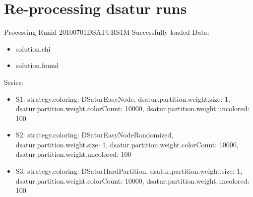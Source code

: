 \documentclass[landscape, 12pt]{report}
\begin{document}
\section{Re-processing dsatur runs}

Processing Runid 20100701DSATURS1M
 Successfully loaded
Data:
\begin{itemize}
\item solution.chi
\item solution.found
\end{itemize}
Series:
\begin{itemize}
\item S1: strategy.coloring: DSaturEasyNode, dsatur.partition.weight.size: 1, dsatur.partition.weight.colorCount: 10000, dsatur.partition.weight.uncolored: 100
\item S2: strategy.coloring: DSaturEasyNodeRandomized, dsatur.partition.weight.size: 1, dsatur.partition.weight.colorCount: 10000, dsatur.partition.weight.uncolored: 100
\item S3: strategy.coloring: DSaturHardPartition, dsatur.partition.weight.size: 1, dsatur.partition.weight.colorCount: 10000, dsatur.partition.weight.uncolored: 100
\end{itemize}
\end{document}
